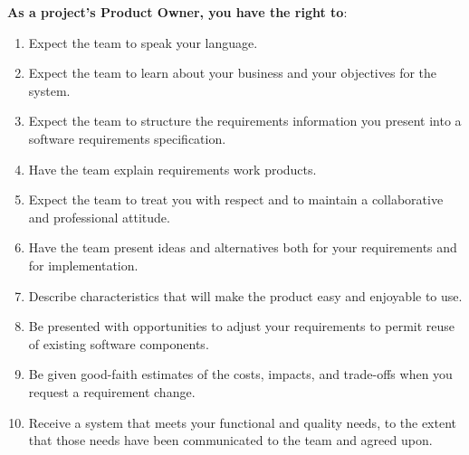 {\bfseries As a project's Product Owner, you have the right to}:
\begin{enumerate}
    \item Expect the team to speak your language.
    \item Expect the team to learn about your business and your objectives for
          the system.
    \item Expect the team to structure the requirements information you present
          into a software requirements specification.
    \item Have the team explain requirements work products.
    \item Expect the team to treat you with respect and to maintain a
          collaborative and professional attitude.
    \item Have the team present ideas and alternatives both for your
          requirements and for implementation.
    \item Describe characteristics that will make the product easy and enjoyable
          to use.
    \item Be presented with opportunities to adjust your requirements to permit
          reuse of existing software components.
    \item Be given good-faith estimates of the costs, impacts, and trade-offs
          when you request a requirement change.
    \item Receive a system that meets your functional and quality needs, to the
          extent that those needs have been communicated to the team and agreed
          upon.
\end{enumerate}